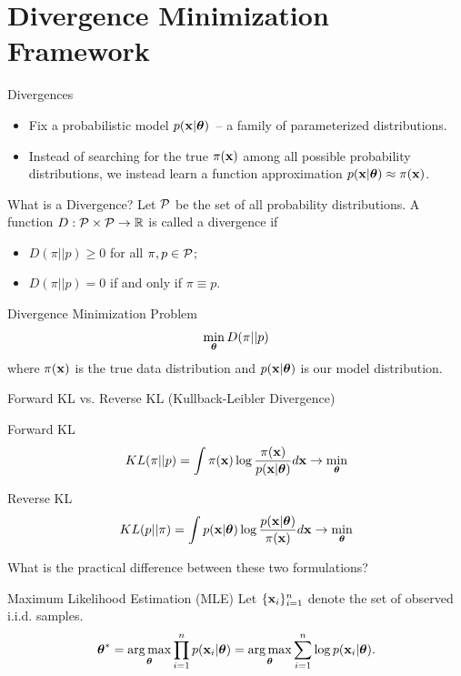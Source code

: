 \documentclass{beamer}
\begin{document}
\section{Divergence Minimization Framework}
\begin{frame}{Divergences}
	\begin{itemize}
	\item Fix a probabilistic model $p(\mathbf{x} | \boldsymbol{\theta})$~-- a family of parameterized distributions. \\
	\item Instead of searching for the true $\pi(\mathbf{x})$ among all possible probability distributions, we instead learn a function approximation $p(\mathbf{x} | \boldsymbol{\theta}) \approx \pi(\mathbf{x})$.
	\end{itemize}
	\begin{block}{What is a Divergence?}
		Let $\mathcal{P}$ be the set of all probability distributions. A function $D: \mathcal{P} \times \mathcal{P} \rightarrow \mathbb{R}$ is called a divergence if 
		\begin{itemize}
			\item $D(\pi || p) \geq 0$ for all $\pi, p \in \mathcal{P}$;
			\item $D(\pi || p) = 0$ if and only if $\pi \equiv p$.
		\end{itemize}
	\end{block}
	\begin{block}{Divergence Minimization Problem}
		\vspace{-0.3cm}
		$$
		\min_{\boldsymbol{\theta}} D(\pi || p)
		$$
		where $\pi(\mathbf{x})$ is the true data distribution and $p(\mathbf{x} | \boldsymbol{\theta})$ is our model distribution.
	\end{block}
\end{frame}
\begin{frame}{Forward KL vs. Reverse KL (Kullback-Leibler Divergence)}
	\begin{block}{Forward KL}
		\vspace{-0.2cm}
		$$
		KL(\pi || p) = \int \pi (\mathbf{x}) \log \frac{\pi(\mathbf{x})}{p(\mathbf{x} | \boldsymbol{\theta})} d \mathbf{x} \rightarrow \min_{\boldsymbol{\theta}}
		$$
	\end{block}
	\begin{block}{Reverse KL}
		\vspace{-0.2cm}
		$$
		KL(p || \pi) = \int p (\mathbf{x}| \boldsymbol{\theta}) \log \frac{p(\mathbf{x}| \boldsymbol{\theta})}{\pi(\mathbf{x})} d \mathbf{x} \rightarrow \min_{\boldsymbol{\theta}}
		$$
	\end{block}
	What is the practical difference between these two formulations?
	
	\begin{block}{Maximum Likelihood Estimation (MLE)}
	Let $\{\mathbf{x}_i\}_{i=1}^n$ denote the set of observed i.i.d. samples.
		\vspace{-0.3cm}
		$$
		\boldsymbol{\theta}^* = \operatorname*{arg\,max}_{\boldsymbol{\theta}} \prod_{i=1}^n p(\mathbf{x}_i | \boldsymbol{\theta}) = \operatorname*{arg\,max}_{\boldsymbol{\theta}} \sum_{i=1}^n \log p(\mathbf{x}_i | \boldsymbol{\theta}).
		$$
	\end{block}
\end{frame}
\end{document}
